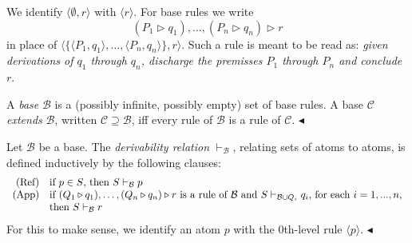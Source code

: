 \documentclass{lipics-v2021}
\newcommand{\fillBox}{\hfill$\blacktriangleleft$}
\newcommand{\deriv}[1]{\vdash_{#1}}       %
\newcommand{\supp}[1]{\Vdash_{#1}}
\newcommand{\base}[1]{\mathcal{#1}}                    %
\newcommand{\brule}[1]{\triangleright{#1}}         %
\begin{document}
We identify $\langle \emptyset, r \rangle$ with $\langle r \rangle$. For base rules we write
\[
(P_1 \brule q_1), \dots, (P_n \brule q_n) \brule r
\]
in place of $\langle \{ \langle P_1, q_1 \rangle, \ldots, \langle P_n, q_n \rangle \}, r \rangle$.
Such a rule is meant to be read as: \emph{given derivations of $q_1$ through $q_n$, discharge the premisses $P_1$ through $P_n$ and conclude $r$}.
\begin{definition}[Base]
\label{def:base}
A \emph{base} $\base{B}$ is a (possibly infinite, possibly empty) set of base rules. A base $\base{C}$ \emph{extends} $\base{B}$, written $\base{C} \supseteq \base{B}$, iff every rule of $\base{B}$ is a rule of $\base{C}$. \fillBox
\end{definition}
\begin{definition}
\label{def:derivability-in-a-base}
Let $\base{B}$ be a base. The \emph{derivability relation} $\deriv{\base{B}}$,
relating sets of atoms to atoms, is defined
inductively by the following clauses:
\[
\begin{array}{rl}
    \mbox{\rm (Ref)} & \mbox{if $p \in S$, then $S \deriv{\base{B}} p$} \\
    \mbox{\rm (App)} & \mbox{if $(Q_1 \brule q_1), \ldots, (Q_n \brule q_n)
        \brule r$ is a rule of $\base{B}$ and
        $S \deriv{\base{B} \cup Q_i} q_i$, for each $i = 1,...,n$,} \\
        & \mbox{then $S \deriv{\base{B}} r$}
\end{array}
\]
For this to make sense, we identify an atom $p$ with the
$0$th-level rule $\langle p \rangle$. \fillBox
\end{definition}
\end{document}
